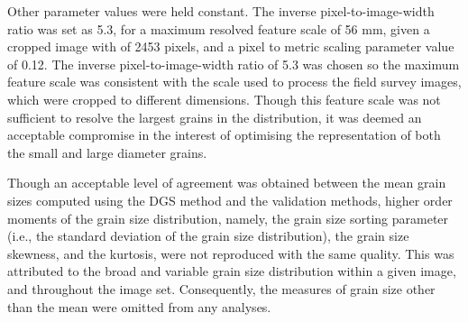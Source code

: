 \documentclass[jmse,article,submit,pdftex,moreauthors]{Definitions/mdpi}
\begin{document}
Other parameter values were held constant. The inverse pixel-to-image-width ratio was set as 5.3, for a maximum resolved feature scale of 56 mm, given a cropped image with of 2453 pixels, and a pixel to metric scaling parameter value of 0.12. The inverse pixel-to-image-width ratio of 5.3 was chosen so the maximum feature scale was consistent with the scale used to process the field survey images, which were cropped to different dimensions. Though this feature scale was not sufficient to resolve the largest grains in the distribution, it was deemed an acceptable compromise in the interest of optimising the representation of both the small and large diameter grains.

Though an acceptable level of agreement was obtained between the mean grain sizes computed using the DGS method and the validation methods, higher order moments of the grain size distribution, namely, the grain size sorting parameter (i.e., the standard deviation of the grain size distribution), the grain size skewness, and the kurtosis, were not reproduced with the same quality. This was attributed to the broad and variable grain size distribution within a given image, and throughout the image set. Consequently, the measures of grain size other than the mean were omitted from any analyses.


\end{document}

